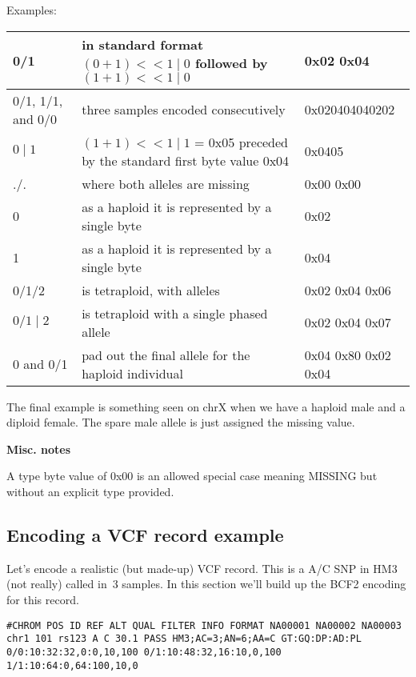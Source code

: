 \documentclass[8pt]{article}
\begin{document}
Examples:

\vspace{0.3cm}
\small
\begin{tabular}{|p{2.5cm} | p{10cm} | p{3cm}|} \hline
0/1 & in standard format $(0 + 1) << 1 \mid 0$ followed by $(1 + 1) << 1 \mid 0$ & 0x02 0x04 \\ \hline
0/1, 1/1, and 0/0 & three samples encoded consecutively & 0x020404040202 \\ \hline
$0\mid1$ & $(1 + 1) << 1 \mid 1$ = 0x05 preceded by the standard first byte value 0x04 & 0x0405 \\ \hline
./. & where both alleles are missing & 0x00 0x00 \\ \hline
0 & as a haploid it is represented by a single byte & 0x02 \\ \hline
1 & as a haploid it is represented by a single byte & 0x04 \\ \hline
0/1/2 & is tetraploid, with alleles & 0x02 0x04 0x06 \\ \hline
$0/1\mid2$ & is tetraploid with a single phased allele & 0x02 0x04 0x07 \\ \hline
0 and 0/1 & pad out the final allele for the haploid individual & 0x04 0x80 0x02 0x04\\ \hline
\end{tabular}
\normalsize

\vspace{0.3cm}
The final example is something seen on chrX when we have a haploid male and a diploid female. The spare male allele is just assigned the missing value.
\vspace{0.3cm}

\textbf{Misc. notes}

A type byte value of 0x00 is an allowed special case meaning MISSING but without an explicit type provided.



\subsection{Encoding a VCF record example}

Let's encode a realistic (but made-up) VCF record.  This is a A/C SNP in HM3
(not really) called in~3 samples.  In this section we'll build up the BCF2
encoding for this record.
\scriptsize
\begin{verbatim}
#CHROM POS ID REF ALT QUAL FILTER INFO FORMAT NA00001 NA00002 NA00003
chr1 101 rs123 A C 30.1 PASS HM3;AC=3;AN=6;AA=C GT:GQ:DP:AD:PL 0/0:10:32:32,0:0,10,100 0/1:10:48:32,16:10,0,100 1/1:10:64:0,64:100,10,0
\end{verbatim}
\normalsize
\end{document}
